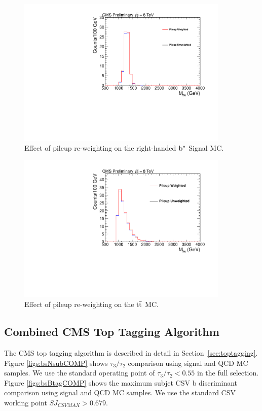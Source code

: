 \begin{figure}[htcb]
\centering
\includegraphics[width=0.9\textwidth]{AN-14-049/figs/Signal_M1300_PileupComp.pdf}
\caption{Effect of pileup re-weighting on the right-handed $\mathrm{b}^{*}$ Signal MC.}
\label{figs:bspileup3}
\end{figure}

\begin{figure}[htcb]
\centering
\includegraphics[width=0.9\textwidth]{AN-14-049/figs/TTbar_PileupComp.pdf}
\caption{Effect of pileup re-weighting on the $\mathrm{t\overline{t}}$ MC.}
\label{figs:bspileup3ttbar}
\end{figure}



\subsection{Combined CMS Top Tagging Algorithm}
\label{sec:bstoptagging}
\label{sec:bssubjetSF}
The CMS top tagging algorithm is described in detail in Section~\ref{sec:toptagging}.
Figure \ref{figs:bsNsubCOMP} shows $\tau_3/\tau_2$ comparison using signal and QCD MC samples.  We use the standard operating point of $\tau_3/\tau_2 < 0.55$ in the full selection.
Figure \ref{figs:bsBtagCOMP} shows the maximum subjet CSV b discriminant comparison using signal and QCD MC samples.  We use the standard CSV working point $SJ_{CSVMAX} > 0.679$.

